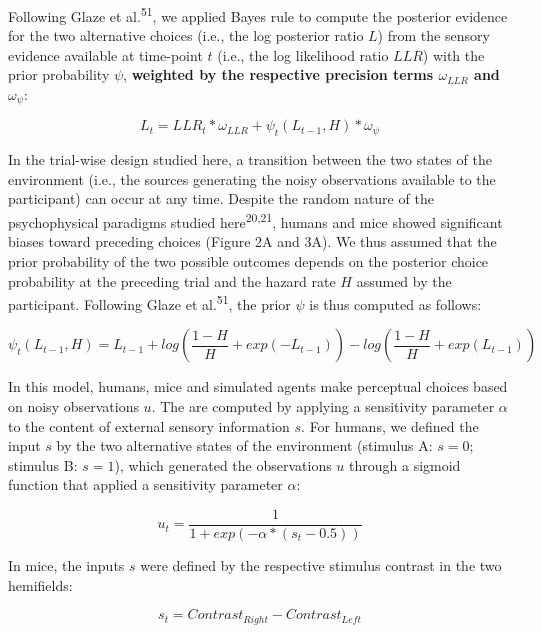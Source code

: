 \documentclass[
]{article}
\begin{document}
Following Glaze et al.\textsuperscript{51}, we applied Bayes rule to
compute the posterior evidence for the two alternative choices (i.e.,
the log posterior ratio \(L\)) from the sensory evidence available at
time-point \(t\) (i.e., the log likelihood ratio \(LLR\)) with the prior
probability \(\psi\), \textbf{weighted by the respective precision terms
\(\omega_{LLR}\) and \(\omega_{\psi}\)}:

\begin{equation}
L_t = LLR_t * \omega_{LLR} + \psi_t(L_{t-1}, H) * \omega_{\psi}
\end{equation}

In the trial-wise design studied here, a transition between the two
states of the environment (i.e., the sources generating the noisy
observations available to the participant) can occur at any time.
Despite the random nature of the psychophysical paradigms studied
here\textsuperscript{20,21}, humans and mice showed significant biases
toward preceding choices (Figure 2A and 3A). We thus assumed that the
prior probability of the two possible outcomes depends on the posterior
choice probability at the preceding trial and the hazard rate \(H\)
assumed by the participant. Following Glaze et al.\textsuperscript{51},
the prior \(\psi\) is thus computed as follows:

\begin{equation}
\psi_t(L_{t-1}, H)  = L_{t-1} + log(\frac{1-H}{H} + exp(-L_{t-1})) - log(\frac{1-H}{H} + exp(L_{t-1}))
\end{equation}

In this model, humans, mice and simulated agents make perceptual choices
based on noisy observations \(u\). The are computed by applying a
sensitivity parameter \(\alpha\) to the content of external sensory
information \(s\). For humans, we defined the input \(s\) by the two
alternative states of the environment (stimulus A: \(s = 0\); stimulus
B: \(s = 1\)), which generated the observations \(u\) through a sigmoid
function that applied a sensitivity parameter \(\alpha\):

\begin{equation}
u_t = \frac{1}{1+exp(-\alpha*(s_t-0.5))}
\end{equation}

In mice, the inputs \(s\) were defined by the respective stimulus
contrast in the two hemifields:

\begin{equation}
s_t = Contrast_{Right} - Contrast_{Left}
\end{equation}
\end{document}
